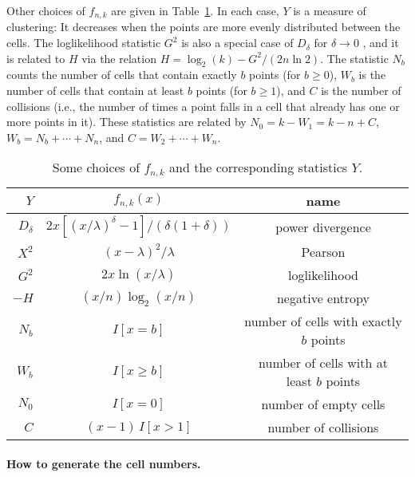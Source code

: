 Other choices of $f_{n,k}$ are given in Table~\ref{tab:choosef}.
In each case, $Y$ is a measure of clustering: It decreases
when the points are more evenly distributed between the cells.
The loglikelihood statistic $G^2$ is also a
  special case of $D_\delta$
for $\delta\to 0$ \cite{tREA88a}, and it is related to $H$ via the relation
$H = \log_2(k) - {G^2 / (2n \ln 2)}$.
The statistic $N_b$ counts the number of cells that
contain exactly $b$ points (for $b\ge 0$), $W_b$ is the number of cells that
contain at least $b$ points (for $b\ge 1$),  %
and $C$ is the number of collisions 
(i.e., the number of times a point falls in 
a cell that already has one or more points in it).
These statistics are related by $N_0 = k - W_1 = k - n + C$,
$W_b = N_b + \cdots + N_n$, and $C = W_2 + \cdots + W_n$.


\begin{table}[htb]
\caption {Some choices of $f_{n,k}$ and the corresponding statistics $Y$.}
\label {tab:choosef}
\smallskip
\centering
\renewcommand {\arraystretch}{1.2}
\begin{tabular}{|rcc|}
\hline
 $Y$        & $f_{n,k}(x)$             &    name  \\
\hline
 $D_\delta$ & $2x[(x/\lambda)^\delta-1]/(\delta(1+\delta)) $
                                       & power divergence \rule{0pt}{16pt}\\
 $X^2$      & $(x-\lambda)^2/\lambda$  & Pearson \\
 $G^2$      & $2x\ln(x/\lambda)$       & loglikelihood \\
 $-H$       & $(x/n)\log_2(x/n)$       & negative entropy \\
 $N_b$      & $I[x = b]$       & number of cells with exactly $b$ points \\
 $W_b$      & $I[x \ge b]$     & number of cells with at least $b$ points \\
 $N_0$      & $I[x = 0]$       & number of empty cells \\
 $C$        & $(x-1)\,I[x>1]$  & number of collisions \\
\hline
\end{tabular}
\end{table}


\paragraph*{How to generate the cell numbers.} \

